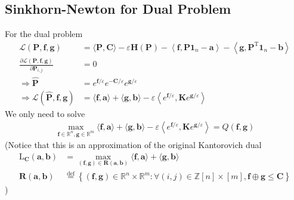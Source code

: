 \documentclass{article}
\begin{document}
\subsection{Sinkhorn-Newton for Dual Problem}
For the dual problem
\begin{align}
\mathcal { L } ( \mathbf { P } , \mathbf { f } , \mathbf { g } ) &= \langle \mathbf { P } , \mathbf { C } \rangle - \varepsilon \mathbf { H } ( \mathbf { P } ) - \left\langle \mathbf { f } , \mathbf { P } \mathbf { 1 } _ { n } - \mathbf { a } \right\rangle - \left\langle \mathbf { g } , \mathbf { P } ^ { \mathrm { T } } \mathbf{ 1 } _ { n } - \mathbf { b } \right\rangle\\
\frac { \partial \mathcal { L } ( \mathbf { P } , \mathbf { f } , \mathbf { g } ) } { \partial \mathbf { P } _ { i , j } } &=0\\
\Rightarrow\hat{\mathbf { P }} &= e ^ { \mathbf { f }  / \varepsilon } e ^ { - \mathbf { C } / \varepsilon } e ^ { \mathbf { g }/ \varepsilon }\\
\Rightarrow \mathcal{L}( \hat{\mathbf { P }} , \mathbf { f } , \mathbf { g } ) &= \langle \mathbf { f } , \mathbf { a } \rangle + \langle \mathbf { g } , \mathbf { b } \rangle - \varepsilon \left\langle e ^ { \mathbf { f } / \varepsilon } , \mathbf { K } e ^ { \mathbf { g } / \varepsilon } \right\rangle
\end{align}
We only need to solve
\begin{align}
\max _ { \mathbf { f } \in \mathbb { R } ^ { n } , \mathbf { g } \in \mathbb { R } ^ { m } } \langle \mathbf { f } , \mathbf { a } \rangle + \langle \mathbf { g } , \mathbf { b } \rangle - \varepsilon \left\langle e ^ { \mathbf { f } / \varepsilon } , \mathbf { K } e ^ { \mathbf { g } / \varepsilon } \right\rangle = Q ( \mathbf { f } , \mathbf { g } )
\end{align}
(Notice that this is an approximation of the original Kantorovich dual
\begin{align}
\mathrm { L } _ { \mathbf { C } } ( \mathbf { a } , \mathbf { b } ) &= \max _ { ( \mathbf { f } , \mathbf { g } ) \in \mathbf { R } ( \mathbf { a } , \mathbf { b } ) } \langle \mathbf { f } , \mathbf { a } \rangle + \langle \mathbf { g } , \mathbf { b } \rangle\\
\mathbf { R } ( \mathbf { a } , \mathbf { b } ) &\stackrel { \mathrm { def } } { = } \left\{ ( \mathbf { f } , \mathbf { g } ) \in \mathbb { R } ^ { n } \times \mathbb { R } ^ { m } : \forall ( i , j ) \in \mathbb { Z } [ n ] \times [ m ] , \mathbf { f } \oplus \mathbf { g } \leq \mathbf { C } \right\}
\end{align}
)
\end{document}
